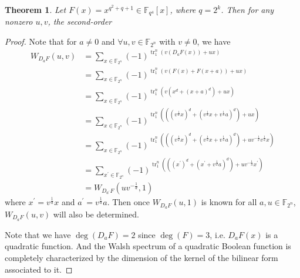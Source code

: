 \documentclass[12 pt]{article}
\newtheorem{theorem}{Theorem}
\def\F{{\mathbb F}}
\newcommand{\tr}{\operatorname{tr}_1^n}
\begin{document}
\begin{theorem}
    Let $ F(x) = x^{q^2+q+1} \in\F_{q^4}[x] $, where $ q = 2^k $. Then for any nonzero $ u,v $, the second-order 
  \end{theorem}
  
  \begin{proof}
    Note that for $ a\ne 0 $ and $ \forall u,v\in\F_{2^n} $ with $ v\ne 0 $, we have
    \begin{align*}
      W_{D_aF}(u,v)&=\sum_{x\in\F_{2^n}}(-1)^{\tr(v(D_aF(x))+ux)}\\
                   &=\sum_{x\in\F_{2^n}}(-1)^{\tr(v(F(x)+F(x+a))+ux)}\\
                   &=\sum_{x\in\F_{2^n}}(-1)^{\tr\left(v\left(x^{d}+(x+a)^{d}\right)+ux\right)}\\
                   &=\sum_{x\in\F_{2^n}}(-1)^{\tr\left(\left(\left(v^{\frac{1}{d}}x\right)^{d}+\left(v^{\frac{1}{d}}x+v^{\frac{1}{d}}a\right)^{d}\right)+ux\right)}\\
                   &=\sum_{x\in\F_{2^n}}(-1)^{\tr\left(\left(\left(v^{\frac{1}{d}}x\right)^{d}+\left(v^{\frac{1}{d}}x+v^{\frac{1}{d}}a\right)^{d}\right)+uv^{-\frac{1}{d}}v^{\frac{1}{d}}x\right)}\\
                   &=\sum_{x^{\prime}\in\F_{2^n}}(-1)^{\tr\left(\left(\left(x^{\prime}\right)^{d}+\left(x^{\prime}+v^{\frac{1}{d}}a\right)^{d}\right)+uv^{-\frac{1}{d}}x^{\prime}\right)}\\
                   &=W_{D_{a^{\prime}}F}\left(uv^{-\frac{1}{d}},1\right)
    \end{align*}
    where $ x^{\prime}=v^{\frac{1}{d}}x $ and $ a^{\prime}=v^{\frac{1}{d}}a $.
    Then once $ W_{D_aF}(u,1) $ is known for all $ a,u\in\F_{2^n} $, $ W_{D_aF}(u,v) $ will also be determined.
  
    Note that we have $ \deg(D_aF)=2 $ since $ \deg(F) = 3 $, i.e. $ D_aF(x) $ is a quadratic function.
    And the Walsh spectrum of a quadratic Boolean function is completely characterized by the  dimension 
    of the kernel of the bilinear form associated to it.  
    

\end{proof}
\end{document}
